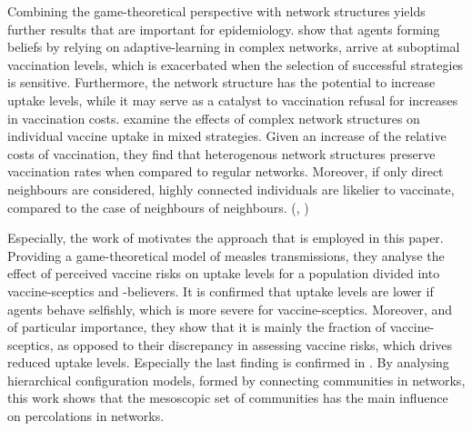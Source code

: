 \documentclass[11pt]{article}
\begin{document}
Combining the game-theoretical perspective with network structures yields further results that are important for epidemiology.   
\cite{fu2010} show that agents forming beliefs by relying on adaptive-learning in complex networks, arrive at suboptimal vaccination levels, which is exacerbated when the selection of successful strategies is sensitive. Furthermore, the network structure has the potential to increase uptake levels, while it may serve as a catalyst to vaccination refusal for increases in vaccination costs. \cite{shi2017} examine the effects of complex network structures on individual vaccine uptake in mixed strategies. Given an increase of the relative costs of vaccination, they find that heterogenous network structures preserve vaccination rates when compared to regular networks. Moreover, if only direct neighbours are considered, highly connected individuals are likelier to vaccinate, compared to the case of neighbours of neighbours. (\citeauthor{shi2017}, \citeyear{shi2017})

Especially, the work of \cite{shim2012} motivates the approach that is employed in this paper. Providing a game-theoretical model of measles transmissions, they analyse the effect of perceived vaccine risks on uptake levels for a population divided into vaccine-sceptics and -believers. It is confirmed that uptake levels are lower if agents behave selfishly, which is more severe for vaccine-sceptics. Moreover, and of particular importance, they show that it is mainly the fraction of vaccine-sceptics, as opposed to their discrepancy in assessing vaccine risks, which drives reduced uptake levels. 
Especially the last finding is confirmed in \cite{Stegehuis2016}. By analysing hierarchical configuration models, formed by connecting communities in networks, this work shows that the mesoscopic set of communities has the main influence on percolations in networks. 

\end{document}
